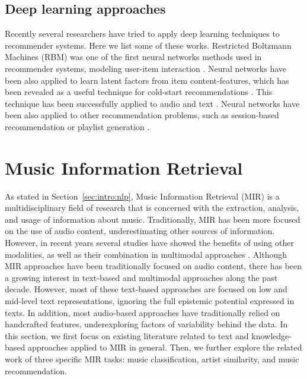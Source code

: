 \subsection{Deep learning approaches}

Recently several researchers have tried to apply deep learning techniques to recommender systems. Here we list some of these works. 
Restricted Boltzmann Machines (RBM) was one of the first neural networks methods used in recommender systems, modeling user-item interaction \citep{salakhutdinov2007restricted}. Neural networks have been also applied to learn latent factors from item content-features, which has been revealed as a useful technique for cold-start recommendations \citep{wang2015collaborative}. This technique has been successfully applied to audio \citep{Oord2013} and text \citep{bansal2016ask}. Neural networks have been also applied to other recommendation problems, such as session-based recommendation \citep{hidasi2015session} or playlist generation \citep{vall2017music}.


\section{Music Information Retrieval}
\label{sec:SOA:mir}

As stated in Section~\ref{sec:intro:nlp}, Music Information Retrieval (MIR) is a multidisciplinary field of research that is concerned with the extraction, analysis, and usage of information about music. Traditionally, MIR has been more focused on the use of audio content, underestimating other sources of information. However, in recent years several studies have showed the benefits of using other modalities, as well as their combination in multimodal approaches \cite{Schedl2014}.
Although MIR approaches have been traditionally focused on audio content, there has been a growing interest in text-based and multimodal approaches along the past decade. However, most of these text-based approaches are focused on low and mid-level text representations, ignoring the full epistemic potential expressed in texts. In addition, most audio-based approaches have traditionally relied on handcrafted features, underexploring factors of variability behind the data.
In this section, we first focus on existing literature related to text and knowledge-based approaches applied to MIR in general. Then, we further explore the related work of three specific MIR tasks: music classification, artist similarity, and music recommendation.

